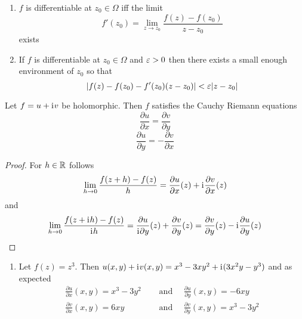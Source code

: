 \begin{remarks}\hfill
	\begin{enumerate}
		\item \( f \) is differentiable at \( z_0 \in \Omega \) iff the limit
		      \[
			      f'(z_0) = \lim_{z \to z_0}  \frac{f(z) - f(z_0)}{z - z_0}
		      \]
		      exists
		\item
		      If \( f \) is differentiable at \( z_0 \in \Omega \) and \( \varepsilon > 0 \) then there exists a small
		      enough environment of \( z_0 \) so that
		      \[
			      | f(z) - f(z_0) - f'(z_0)(z - z_0)| < \varepsilon |z - z_0|
		      \]
	\end{enumerate}
\end{remarks}
\bigskip


\begin{theorem}\label{thm:thm_cauchy_riemann_eqations}
	Let \( f = u + \mathrm{i}\mkern1mu v \) be holomorphic. Then \( f \) satisfies the Cauchy Riemann equations
	\[
		\frac{\partial u}{\partial x} = \frac{\partial v}{\partial y}
	\]
	\[
		\frac{\partial u}{\partial y} = - \frac{\partial v}{\partial x}
	\]
\end{theorem}

\begin{proof}
	For \( h \in \mathbb{R} \) follows
	\[
		\lim_{h \to 0}\frac{f(z + h) - f(z)}{h} = \frac{\partial u}{\partial x}(z) + \mathrm{i}\mkern1mu \frac{\partial v}{\partial x}(z)
	\]
	and
	\[
		\lim_{h \to 0}\frac{f(z + \mathrm{i}\mkern1mu h) - f(z)}{\mathrm{i}\mkern1mu h}
		= \frac{\partial u}{\mathrm{i}\mkern1mu\partial y}(z) + \frac{\partial v}{\partial y}(z)
		= \frac{\partial v}{\partial y}(z) - \mathrm{i}\mkern1mu\frac{\partial u}{\partial y}(z)
	\]

\end{proof}
\bigskip


\begin{examples}\hfill
	\begin{enumerate}
		\item Let \( f(z) = z^3 \). Then \( u(x,y) + \mathrm{i}\mkern1mu v(x,y) = x^3 - 3xy^2 + \mathrm{i}\mkern1mu (3x^2y -y^3) \) and as expected
		      \[
			      \begin{split}
				      \frac{\partial u}{\partial x}(x,y) = x^3 - 3y^2 & \quad\text{ and }\quad
				      \frac{\partial u}{\partial y}(x,y) = -6xy \\
				      \frac{\partial v}{\partial x}(x,y) = 6xy & \quad\text{ and }\quad
				      \frac{\partial v}{\partial y}(x,y) = x^3 - 3y^2
			      \end{split}
		      \]
	\end{enumerate}
\end{examples}
\bigskip


